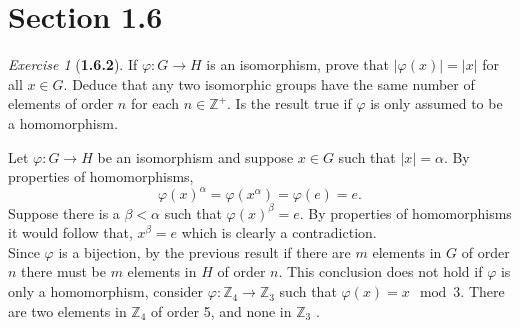 \documentclass[12pt]{amsart}
\makeatletter
\theoremstyle{remark}
\newtheorem*{exercise}{Exercise}%
\def\ZZ{\ensuremath{\mathbb Z}}
\renewenvironment{proof}[1][\proofname]{\par\doublespacing
  \pushQED{\qed}%
  \normalfont \topsep6\p@\@plus6\p@\relax
  \list{}{%
    \settowidth{\leftmargin}{\itshape\proofname:\hskip\labelsep}%
    \setlength{\labelwidth}{0pt}%
    \setlength{\itemindent}{-\leftmargin}%
  }%
  \item[\hskip\labelsep\itshape#1\@addpunct{:}]\ignorespaces
}{%
  \popQED\endlist\@endpefalse
  \singlespacing
}
\theoremstyle{mycomment}
\makeatother
\begin{document}
\thispagestyle{fancy}
\author{Coordinator: Coordinator's Name}





%



\section*{\textbf{Section 1.6}}

\begin{exercise}[\textbf{1.6.2}]If $\varphi: G \to H$ is an isomorphism, prove that $|\varphi(x)| = |x|$ for all $x \in G$. Deduce that any two 
  isomorphic groups have the same number of elements of order $n$ for each $n\in \ZZ^+$. Is the result true if $\varphi$ is only assumed to be a homomorphism.  
  \begin{proof} Let $\varphi: G \to H$ be an isomorphism and suppose $x \in G$ such that $|x| = \alpha$. By properties of homomorphisms,
    \begin{equation*}
        \varphi(x)^\alpha = \varphi(x^\alpha) = \varphi(e) = e. 
    \end{equation*}
    Suppose there is a $\beta < \alpha$ such that $\varphi(x)^{\beta} = e$. By properties of homomorphisms it would follow that, $x^\beta = e$ which is clearly a contradiction.\\
    Since $\varphi$ is a bijection, by the previous result if there are $m$ elements in $G$ of order $n$ there must be $m$ elements in $H$ of order $n$. This conclusion does not hold 
    if $\varphi$ is only a homomorphism, consider $\varphi: \ZZ_4 \to \ZZ_3$ such that $\varphi(x) = x \mod 3$. There are two elements in $\ZZ_4$ of order 5, and none in $\ZZ_3$ .
  \end{proof}
\end{exercise}
\vspace{.15in}
\end{document}
